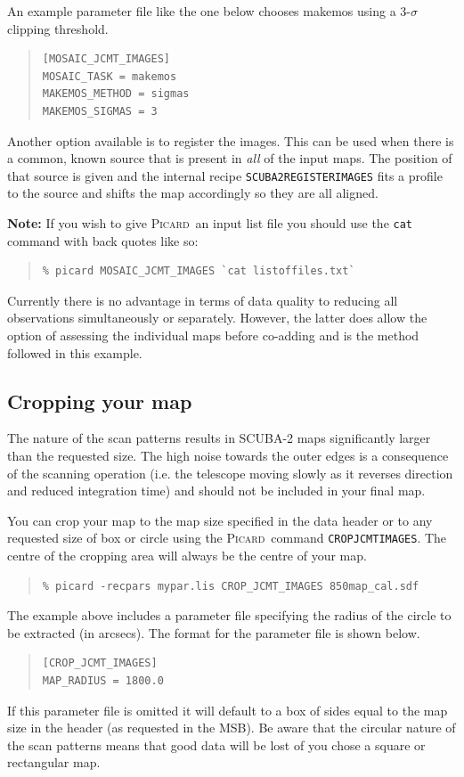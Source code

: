 \documentclass[twoside,11pt]{article}
\newcommand{\xref}[3]{#1}
\newcommand{\xlabel}[1]{}
\renewcommand{\_}{\texttt{\symbol{95}}}
\newenvironment{myquote}{\begin{quote}\begin{small}}{\end{small}\end{quote}}
\newcommand{\picard}{\xref{\textsc{Picard}}{sun265}{}}
\newcommand{\task}[1]{\textsf{#1}}
\newcommand{\param}[1]{\texttt{#1}}
\begin{document}
An example parameter file like the one below chooses \task{makemos} using a
3-$\sigma$ clipping threshold.
\begin{myquote}
\begin{verbatim}
[MOSAIC_JCMT_IMAGES]
MOSAIC_TASK = makemos
MAKEMOS_METHOD = sigmas
MAKEMOS_SIGMAS = 3
\end{verbatim}
\end{myquote}
Another option available is to register the images. This can be used
when there is a common, known source that is present in \emph{all} of
the input maps. The position of that source is given and the internal
recipe \param{SCUBA2\_REGISTER\_IMAGES} fits a profile to the source
and shifts the map accordingly so they are all aligned.

\textbf{Note:} If you wish to give \picard\ an input list file you should
use the \texttt{cat} command with back quotes like so:
\begin{myquote}
\begin{verbatim}
% picard MOSAIC_JCMT_IMAGES `cat listoffiles.txt`
\end{verbatim}
\end{myquote}


Currently there is no advantage in terms of data quality to reducing
all observations simultaneously or separately. However, the latter
does allow the option of assessing the individual maps before co-adding
and is the method followed in this example.

\subsection{\xlabel{crop}Cropping your map}
\label{sec:crop}

The nature of the scan patterns results in SCUBA-2 maps significantly
larger than the requested size. The high noise towards the outer edges
is a consequence of the scanning operation (i.e. the telescope moving
slowly as it reverses direction and reduced integration time) and
should not be included in your final map.

You can crop your map to the map size specified in the data header or
to any requested size of box or circle using the \picard\ command
\param{CROP\_JCMT\_IMAGES}. The centre of the cropping area will
always be the centre of your map.
\begin{myquote}
\begin{verbatim}
% picard -recpars mypar.lis CROP_JCMT_IMAGES 850map_cal.sdf
\end{verbatim}
\end{myquote}
The example above includes a parameter file specifying the radius of
the circle to be extracted (in arcsecs).  The format for the parameter
file is shown below.
\begin{myquote}
\begin{verbatim}
[CROP_JCMT_IMAGES]
MAP_RADIUS = 1800.0
\end{verbatim}
\end{myquote}
If this parameter file is omitted it will default to a box of sides
equal to the map size in the header (as requested in the MSB). Be
aware that the circular nature of the scan patterns means that good
data will be lost of you chose a square or rectangular map.
\end{document}
